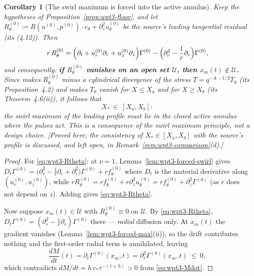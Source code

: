 \documentclass[11pt]{article}
\newtheorem{corollary}[theorem]{Corollary}
\theoremstyle{definition}
\theoremstyle{remark}
\begin{document}
\begin{corollary}[The swirl maximum is forced into the active annulus]
  \label{cor:wpt3-annulus}
  Keep the hypotheses of Proposition~\ref{prop:wpt3-floor}, and let
  $R^{(0)}_\theta\coloneqq R(u^{(0)},p^{(0)})\cdot e_\theta
    +\partial_z^2u^{(0)}_\theta$ be the source's leading tangential residual
  (its (4.12)). Then
  \begin{equation}\label{eq:wpt3-Rtheta}
    r\,R^{(0)}_\theta
      =\Bigl(\partial_t+u^{(0)}_r\partial_r+u^{(0)}_z\partial_z\Bigr)
         \Gamma^{(0)}
       -\Bigl(\partial_r^2-\frac1r\partial_r\Bigr)\Gamma^{(0)},
  \end{equation}
  and consequently: \textbf{if $R^{(0)}_\theta$ vanishes on an open set
  $\mathcal U$, then $x_m(t)\notin\mathcal U$.} Since \cite{OpenAI2026} makes
  $R^{(0)}_\theta$ minus a cylindrical divergence of the stress
  $T=q^{-A-1/2}T_0$ (its Proposition~4.2) and makes $T_0$ vanish for
  $X\leq X_a$ and for $X\geq X_b$ (its Theorem~4.6(ii)), it follows that
  \[
    X_*\ \in\ [X_a,X_b] :
  \]
  the swirl maximum of the leading profile must lie in the closed active
  annulus where the pulses act. This is a \emph{consequence} of the swirl
  maximum principle, not a design choice. \emph{[Proved here; the
  consistency of $X_*\in[X_a,X_b]$ with the source's profile is discussed,
  and left open, in Remark~\ref{rem:wpt3-comparison}(d).]}
\end{corollary}
\begin{proof}
  For \eqref{eq:wpt3-Rtheta}: at $\nu=1$,
  Lemma~\ref{lem:wpt3-forced-swirl} gives
  $D_t\Gamma^{(0)}
   =\bigl(\partial_r^2-\tfrac1r\partial_r+\partial_z^2\bigr)\Gamma^{(0)}
    +rf^{(0)}_\theta$
  where $D_t$ is the material derivative along $(u_r^{(0)},u_z^{(0)})$, while
  $rR^{(0)}_\theta=rf^{(0)}_\theta+r\partial_z^2u^{(0)}_\theta
   =rf^{(0)}_\theta+\partial_z^2\Gamma^{(0)}$ (as $r$ does not depend on
  $z$). Adding gives \eqref{eq:wpt3-Rtheta}.

  Now suppose $x_m(t)\in\mathcal U$ with $R^{(0)}_\theta\equiv0$ on
  $\mathcal U$. By \eqref{eq:wpt3-Rtheta},
  $D_t\Gamma^{(0)}=(\partial_r^2-\tfrac1r\partial_r)\Gamma^{(0)}$ there ---
  \emph{radial} diffusion only. At $x_m(t)$ the gradient vanishes
  (Lemma~\ref{lem:wpt3-forced-max}(ii)), so the drift contributes nothing and
  the first-order radial term is annihilated, leaving
  \[
    \frac{dM}{dt}(t)=\partial_t\Gamma^{(0)}(x_m,t)
      =\partial_r^2\Gamma^{(0)}(x_m,t)\ \leq\ 0 ,
  \]
  which contradicts $dM/dt=h\,c_*\tau^{-(1+h)}>0$ from
  \eqref{eq:wpt3-Mdot}.
\end{proof}
\end{document}
